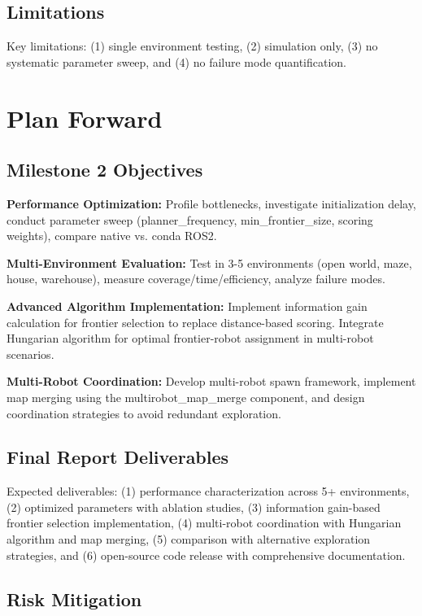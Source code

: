 \documentclass[conference]{IEEEtran}
\begin{document}
\subsection{Limitations}

Key limitations: (1) single environment testing, (2) simulation only, (3) no systematic parameter sweep, and (4) no failure mode quantification.

\section{Plan Forward}

\subsection{Milestone 2 Objectives}

\textbf{Performance Optimization:} Profile bottlenecks, investigate initialization delay, conduct parameter sweep (planner\_frequency, min\_frontier\_size, scoring weights), compare native vs. conda ROS2.

\textbf{Multi-Environment Evaluation:} Test in 3-5 environments (open world, maze, house, warehouse), measure coverage/time/efficiency, analyze failure modes.

\textbf{Advanced Algorithm Implementation:} Implement information gain calculation for frontier selection to replace distance-based scoring. Integrate Hungarian algorithm for optimal frontier-robot assignment in multi-robot scenarios.

\textbf{Multi-Robot Coordination:} Develop multi-robot spawn framework, implement map merging using the multirobot\_map\_merge component, and design coordination strategies to avoid redundant exploration.

\subsection{Final Report Deliverables}

Expected deliverables: (1) performance characterization across 5+ environments, (2) optimized parameters with ablation studies, (3) information gain-based frontier selection implementation, (4) multi-robot coordination with Hungarian algorithm and map merging, (5) comparison with alternative exploration strategies, and (6) open-source code release with comprehensive documentation.

\subsection{Risk Mitigation}
\end{document}
